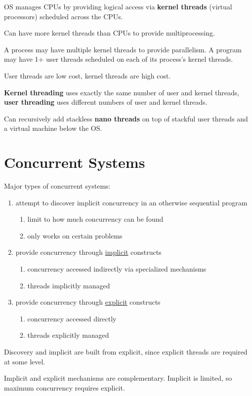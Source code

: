 \documentclass[11pt]{article}
\begin{document}
OS manages CPUs by providing logical access via \textbf{kernel threads} (virtual processors) scheduled
across the CPUs.

Can have more kernel threads than CPUs to provide multiprocessing.

A process may have multiple kernel threads to provide parallelism.
A program may have 1+ user threads scheduled on each of its process's kernel threads.

User threads are low cost, kernel threads are high cost.

\textbf{Kernel threading} uses exactly the same number of user and kernel threads, \textbf{user threading}
uses different numbers of user and kernel threads.

Can recursively add stackless \textbf{nano threads} on top of stackful user threads and a virtual machine below
the OS.
\section{Concurrent Systems}
\label{sec:org859bdf6}
Major types of concurrent systems:
\begin{enumerate}
\item attempt to discover implicit concurrency in an otherwise sequential program
\begin{enumerate}
\item limit to how much concurrency can be found
\item only works on certain problems
\end{enumerate}
\item provide concurrency through \uline{implicit} constructs
\begin{enumerate}
\item concurrency accessed indirectly via specialized mechanisms
\item threads implicitly managed
\end{enumerate}
\item provide concurrency through \uline{explicit} constructs
\begin{enumerate}
\item concurrency accessed directly
\item threads explicitly managed
\end{enumerate}
\end{enumerate}

Discovery and implicit are built from explicit, since explicit threads are required at some level.

Implicit and explicit mechanisms are complementary.
Implicit is limited, so maximum concurrency requires explicit.
\end{document}
